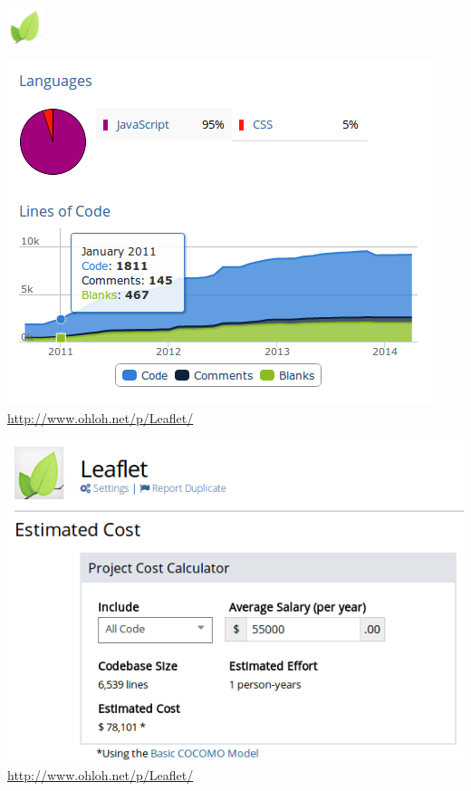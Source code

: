 \begin{frame} %
\begin{center}
\begin{flushright}
    \includegraphics[width=0.08\textwidth]{imgs/leaflet.png}
\end{flushright}

 {
    \includegraphics[width=.7\textwidth]{imgs/leaflet-code.png}\\
    \url{http://www.ohloh.net/p/Leaflet/}
}

 {
    \includegraphics[width=.7\textwidth]{imgs/leaflet-costs.png}\\
    \url{http://www.ohloh.net/p/Leaflet/}
}


\end{center}
\end{frame}
